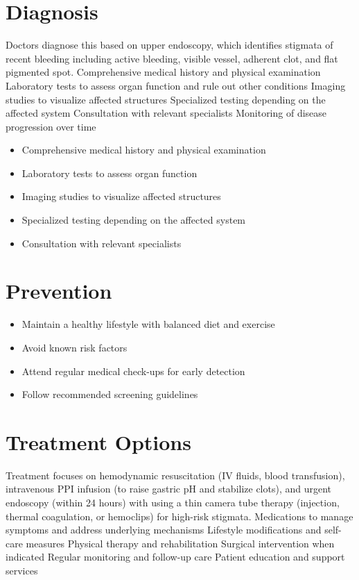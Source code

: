 \section{Diagnosis}
Doctors diagnose this based on upper endoscopy, which identifies stigmata of recent bleeding including active bleeding, visible vessel, adherent clot, and flat pigmented spot. Comprehensive medical history and physical examination Laboratory tests to assess organ function and rule out other conditions Imaging studies to visualize affected structures Specialized testing depending on the affected system Consultation with relevant specialists Monitoring of disease progression over time

\begin{itemize}[noitemsep]
  \item Comprehensive medical history and physical examination
  \item Laboratory tests to assess organ function
  \item Imaging studies to visualize affected structures
  \item Specialized testing depending on the affected system
  \item Consultation with relevant specialists
\end{itemize}
\section{Prevention}
\begin{itemize}[noitemsep]
  \item Maintain a healthy lifestyle with balanced diet and exercise
  \item Avoid known risk factors
  \item Attend regular medical check-ups for early detection
  \item Follow recommended screening guidelines
\end{itemize}
\section{Treatment Options}
Treatment focuses on hemodynamic resuscitation (IV fluids, blood transfusion), intravenous PPI infusion (to raise gastric pH and stabilize clots), and urgent endoscopy (within 24 hours) with using a thin camera tube therapy (injection, thermal coagulation, or hemoclips) for high-risk stigmata. Medications to manage symptoms and address underlying mechanisms Lifestyle modifications and self-care measures Physical therapy and rehabilitation Surgical intervention when indicated Regular monitoring and follow-up care Patient education and support services

